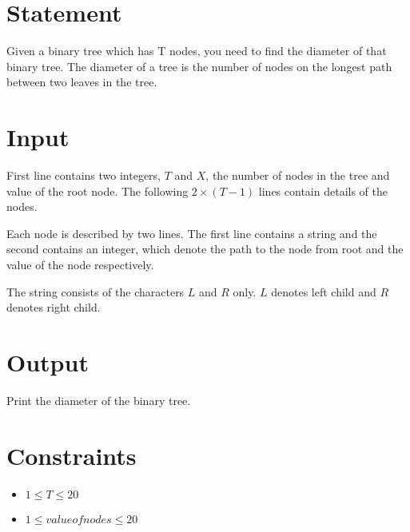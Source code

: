 \documentclass{article}
\begin{document}
\section*{Statement}

Given a binary tree which has T nodes, you need to find the diameter of that binary tree. The diameter of a tree is the number of nodes on the longest path between two leaves in the tree.

\section*{Input}

First line contains two integers, $T$ and $X$, the number of nodes in the tree and value of the root node. The following $2 \times (T - 1)$ lines contain details of the nodes.

Each node is described by two lines. The first line contains a string and the second contains an integer, which denote the path to the node from root and the value of the node respectively.

The string consists of the characters $L$ and $R$ only. $L$ denotes left child and $R$ denotes right child.

\section*{Output}

Print the diameter of the binary tree.

\section*{Constraints}

\begin{itemize}
    \item $1 \le T \le 20$
    \item $1 \le valueofnodes \le 20$
\end{itemize}
\end{document}
